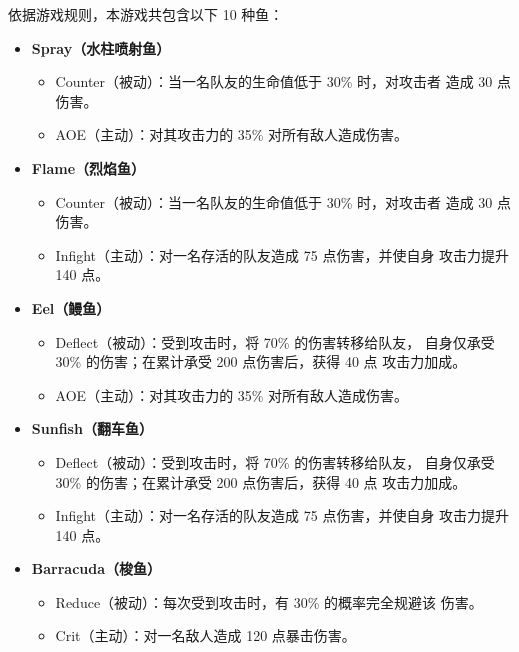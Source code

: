 依据游戏规则，本游戏共包含以下 10 种鱼：

\begin{itemize}
    \item \textbf{Spray（水柱喷射鱼）}
        \begin{itemize}
            \item Counter（被动）：当一名队友的生命值低于 30\% 时，对攻击者
                  造成 30 点伤害。
            \item AOE（主动）：对其攻击力的 35\% 对所有敌人造成伤害。
        \end{itemize}
    \item \textbf{Flame（烈焰鱼）}
        \begin{itemize}
            \item Counter（被动）：当一名队友的生命值低于 30\% 时，对攻击者
                  造成 30 点伤害。
            \item Infight（主动）：对一名存活的队友造成 75 点伤害，并使自身
                  攻击力提升 140 点。
        \end{itemize}
    \item \textbf{Eel（鳗鱼）}
        \begin{itemize}
            \item Deflect（被动）：受到攻击时，将 70\% 的伤害转移给队友，
                  自身仅承受 30\% 的伤害；在累计承受 200 点伤害后，获得 40 点
                  攻击力加成。
            \item AOE（主动）：对其攻击力的 35\% 对所有敌人造成伤害。
        \end{itemize}
    \item \textbf{Sunfish（翻车鱼）}
        \begin{itemize}
            \item Deflect（被动）：受到攻击时，将 70\% 的伤害转移给队友，
                  自身仅承受 30\% 的伤害；在累计承受 200 点伤害后，获得 40 点
                  攻击力加成。
            \item Infight（主动）：对一名存活的队友造成 75 点伤害，并使自身
                  攻击力提升 140 点。
        \end{itemize}
    \item \textbf{Barracuda（梭鱼）}
        \begin{itemize}
            \item Reduce（被动）：每次受到攻击时，有 30\% 的概率完全规避该
                  伤害。
            \item Crit（主动）：对一名敌人造成 120 点暴击伤害。

\end{itemize}
\end{itemize}
